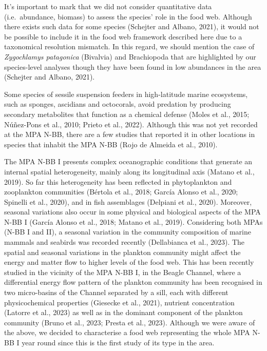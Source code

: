 \documentclass[preprint, 3p,
authoryear]{elsarticle} %
\begin{document}
It's important to mark that we did not consider quantitative data
(i.e.~abundance, biomass) to assess the species' role in the food web.
Although there exists such data for some species (Schejter and Albano,
2021), it would not be possible to include it in the food web framework
described here due to a taxonomical resolution mismatch. In this regard,
we should mention the case of \emph{Zygochlamys patagonica} (Bivalvia)
and Brachiopoda that are highlighted by our species-level analyses
though they have been found in low abundances in the area (Schejter and
Albano, 2021).

Some species of sessile suspension feeders in high-latitude marine
ecosystems, such as sponges, ascidians and octocorals, avoid predation
by producing secondary metabolites that function as a chemical defense
(Moles et al., 2015; Núñez-Pons et al., 2010; Prieto et al., 2022).
Although this was not yet recorded at the MPA N-BB, there are a few
studies that reported it in other locations in species that inhabit the
MPA N-BB (Rojo de Almeida et al., 2010).

The MPA N-BB I presents complex oceanographic conditions that generate
an internal spatial heterogeneity, mainly along its longitudinal axis
(Matano et al., 2019). So far this heterogeneity has been reflected in
phytoplankton and zooplankton communities (Bértola et al., 2018; García
Alonso et al., 2020; Spinelli et al., 2020), and in fish assemblages
(Delpiani et al., 2020). Moreover, seasonal variations also occur in
some physical and biological aspects of the MPA N-BB I (García Alonso et
al., 2018; Matano et al., 2019). Considering both MPAs (N-BB I and II),
a seasonal variation in the community composition of marine mammals and
seabirds was recorded recently (Dellabianca et al., 2023). The spatial
and seasonal variations in the plankton community might affect the
energy and matter flow to higher levels of the food web. This has been
recently studied in the vicinity of the MPA N-BB I, in the Beagle
Channel, where a differential energy flow pattern of the plankton
community has been recognised in two micro-basins of the Channel
separated by a sill, each with different physicochemical properties
(Giesecke et al., 2021), nutrient concentration (Latorre et al., 2023)
as well as in the dominant component of the plankton community (Bruno et
al., 2023; Presta et al., 2023). Although we were aware of the above, we
decided to characterise a food web representing the whole MPA N-BB I
year round since this is the first study of its type in the area.
\end{document}
